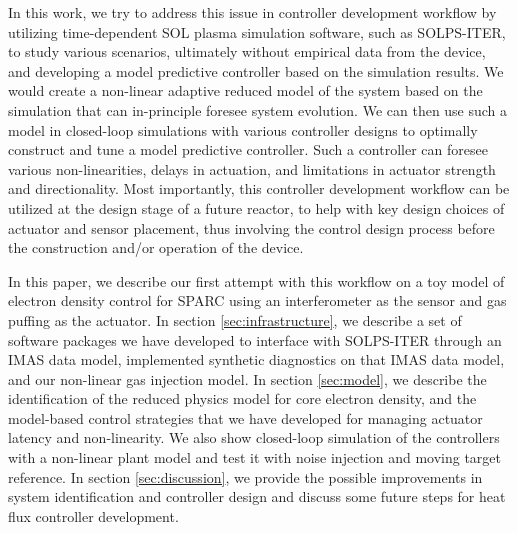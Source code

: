 In this work, we try to address this issue in controller development workflow by utilizing time-dependent \ac{SOL} plasma simulation software, such as \ac{SOLPS-ITER}\cite{bonnin_2016_pfr}, to study various scenarios, ultimately without empirical data from the device, and developing a model predictive controller based on the simulation results. We would create a non-linear adaptive reduced model of the system based on the simulation that can in-principle foresee system evolution. We can then use such a model in closed-loop simulations with various controller designs to optimally construct and tune a model predictive controller. Such a controller can foresee various non-linearities, delays in actuation, and limitations in actuator strength and directionality. Most importantly, this controller development workflow can be utilized at the design stage of a future reactor, to help with key design choices of actuator and sensor placement, thus involving the control design process before the construction and/or operation of the device. 

In this paper, we describe our first attempt with this workflow on a toy model of electron density control for SPARC using an interferometer as the sensor and gas puffing as the actuator. In section \ref{sec:infrastructure}, we describe a set of software packages we have developed to interface with \ac{SOLPS-ITER} through an \ac{IMAS} data model, implemented synthetic diagnostics on that \ac{IMAS} data model, and our non-linear gas injection model. In section \ref{sec:model}, we describe the identification of the reduced physics model for core electron density, and the model-based control strategies that we have developed for managing actuator latency and non-linearity. We also show closed-loop simulation of the controllers with a non-linear plant model and test it with noise injection and moving target reference. In section \ref{sec:discussion}, we provide the possible improvements in system identification and controller design and discuss some future steps for heat flux controller development.